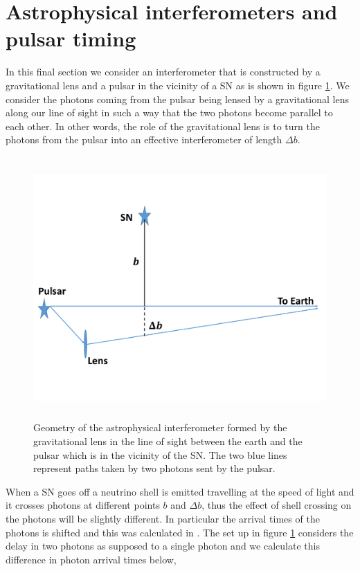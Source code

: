 \documentclass[aps,showpacs,twocolumn,floats,prd,superscriptaddress,nofootinbib]{revtex4-1}
\begin{document}
\section{Astrophysical interferometers and pulsar timing}

In this final section we consider an interferometer that is constructed by a gravitational lens and a pulsar in the vicinity of a SN as is shown in figure \ref{fig:4}. We consider the photons coming from the pulsar being lensed by a gravitational lens along our line of sight in such a way that the two photons become parallel to each other. In other words, the role of the gravitational lens is to turn the photons from the pulsar into an effective interferometer of length $\Delta b$. 
\begin{figure}[h!]
\begin{center}
\includegraphics[width=\textwidth,height=10cm]{Lens.pdf}
\caption{Geometry of the astrophysical interferometer formed by the gravitational lens in the line of sight between the earth and the pulsar which is in the vicinity of the SN. The two blue lines represent paths taken by two photons sent by the pulsar.}
\label{fig:4}
\end{center}
\end{figure}
When a SN goes off a neutrino shell is emitted travelling at the speed of light and it crosses photons at different points $b$ and $\Delta b$, thus the effect of shell crossing on the photons will be slightly different. In particular the arrival times of the photons is shifted and this was calculated in \cite{Olum:2013gza}. The set up in figure \ref{fig:4} considers the delay in two photons as supposed to a single photon and we calculate this difference in photon arrival times below,
\end{document}
